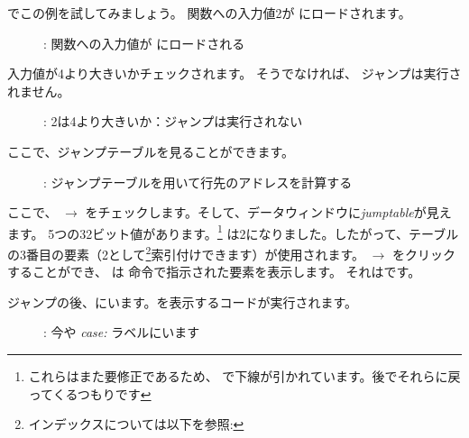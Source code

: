 ﻿\clearpage
\mysubparagraph{\olly}
\myindex{\olly}

\olly でこの例を試してみましょう。
関数への入力値2が \EAX にロードされます。

\begin{figure}[H]
\centering
{}
\caption{\olly: 関数への入力値が \EAX にロードされる}
\label{fig:switch_lot_olly1}
\end{figure}

\clearpage
入力値が4より大きいかチェックされます。
そうでなければ、 ジャンプは実行されません。

\begin{figure}[H]
\centering
{}
\caption{\olly: 2は4より大きいか：ジャンプは実行されない}
\label{fig:switch_lot_olly2}
\end{figure}

\clearpage
ここで、ジャンプテーブルを見ることができます。

\begin{figure}[H]
\centering
{}
\caption{\olly: ジャンプテーブルを用いて行先のアドレスを計算する}
\label{fig:switch_lot_olly3}
\end{figure}

ここで、 $\rightarrow$  をチェックします。そして、データウィンドウに\emph{jumptable}が見えます。
5つの32ビット値があります。\footnote{これらはまた要修正であるため、 \olly で下線が引かれています。後でそれらに戻ってくるつもりです}
\ECX は2になりました。したがって、テーブルの3番目の要素（2として\footnote{インデックスについては以下を参照: }索引付けできます）が使用されます。
 $\rightarrow$ をクリックすることができ、
\olly は \JMP 命令で指示された要素を表示します。
それはです。

\clearpage
ジャンプの後、にいます。を表示するコードが実行されます。

\begin{figure}[H]
\centering
{}
\caption{\olly: 今や \emph{case:} ラベルにいます}
\label{fig:switch_lot_olly4}
\end{figure}
